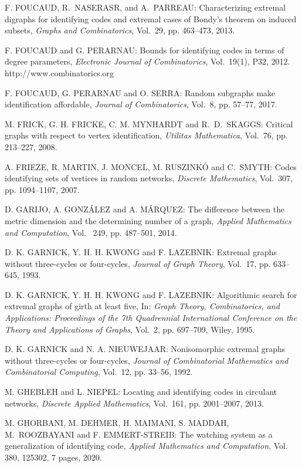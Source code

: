 \begin{thebibliography}{999}
F. FOUCAUD, R.~NASERASR, and A.~PARREAU: Characterizing extremal digraphs for identifying codes and extremal cases of Bondy's theorem on induced subsets, {\it Graphs and Combinatorics}, Vol.~29, pp. 463--473, 2013.

F. FOUCAUD and G. PERARNAU: Bounds for identifying codes in terms of degree parameters, {\it Electronic Journal of Combinatorics}, Vol.~19(1), P32, 2012.\\
http://www.combinatorics.org

F. FOUCAUD, G. PERARNAU and O. SERRA: Random subgraphs make identification affordable, {\it Journal of  Combinatorics}, Vol.~8, pp. 57--77, 2017.

M. FRICK, G. H. FRICKE, C. M. MYNHARDT and R.~D.~SKAGGS: Critical graphs with respect to vertex identification, {\it Utilitas Mathematica}, Vol.~76, pp. 213--227, 2008.

A. FRIEZE, R. MARTIN, J. MONCEL, M. RUSZINK\'O and C.~SMYTH: Codes identifying sets of vertices in random networks, {\it Discrete Mathematics}, Vol.~307, pp. 1094--1107, 2007.

D. GARIJO, A. GONZ\'ALEZ and A. M\'ARQUEZ: The difference between the metric dimension and the determining number of a graph, {\it Applied Mathematics and Computation}, Vol.~ 249, pp. 487--501, 2014.
  
D. K. GARNICK, Y. H. H. KWONG and F. LAZEBNIK: Extremal graphs without three-cycles or four-cycles, {\it Journal of Graph Theory}, Vol.~17, pp. 633--645, 1993.

D. K. GARNICK, Y. H. H. KWONG and F. LAZEBNIK: Algorithmic search for extremal graphs of girth at least five, In: {\it Graph Theory, Combinatorics, and Applications: Proceedings of the 7th Quadrennial International Conference on the Theory and Applications of Graphs}, Vol.~2, pp. 697--709, Wiley, 1995.

D. K. GARNICK and N. A. NIEUWEJAAR: Nonisomorphic extremal graphs without three-cycles or four-cycles, {\it Journal of Combinatorial Mathematics and Combinatorial Computing}, Vol.~12, pp. 33--56, 1992.

M. GHEBLEH and L. NIEPEL: Locating and identifying codes in circulant networks, {\it Discrete Applied Mathematics}, Vol.~161, pp. 2001--2007, 2013.

M. GHORBANI, M. DEHMER, H. MAIMANI, S. MADDAH, M.~ROOZ\-BAYANI and F. EMMERT-STREIB: The watching system as a generalization of identifying code, {\it Applied Mathematics and Computation}, Vol. 380, 125302, 7 pages, 2020.


\end{thebibliography}
